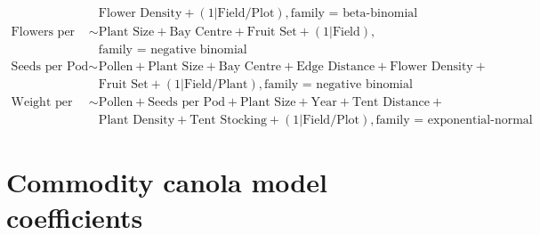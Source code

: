 \begin{align*}
    &   \text{Flower Density} + (1|\text{Field/Plot}), \text{family = beta-binomial} \\
    \text{Flowers per Plant} \sim & \text{Plant Size} + \text{Bay Centre} + \text{Fruit Set} + (1|\text{Field}),\\
    &   \text{family = negative binomial} \\
    \text{Seeds per Pod} \sim & \text{Pollen} + \text{Plant Size} + \text{Bay Centre} + \text{Edge Distance} + \text{Flower Density} +\\
    &   \text{Fruit Set} + (1|\text{Field/Plant}), \text{family = negative binomial} \\
    \text{Weight per Seed} \sim & \text{Pollen} + \text{Seeds per Pod} + \text{Plant Size} + \text{Year} + \text{Tent Distance} +\\
    &   \text{Plant Density} + \text{Tent Stocking} + (1|\text{Field/Plot}), \text{family = exponential-normal}
\end{align*}

\section*{Commodity canola model coefficients}

